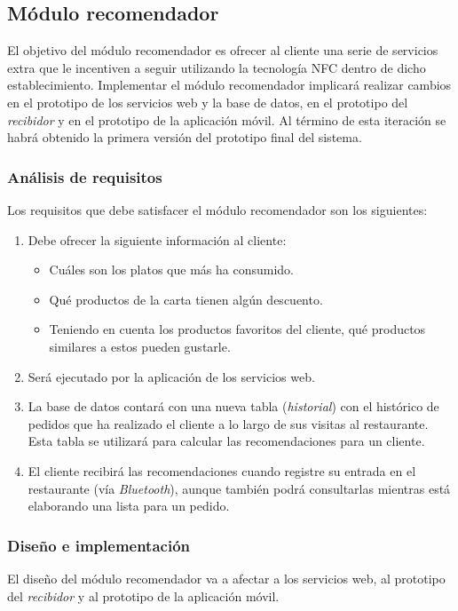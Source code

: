 \subsection{Módulo recomendador}
El objetivo del módulo recomendador es ofrecer al cliente una serie de
servicios extra que le incentiven a seguir utilizando la tecnología \acs{NFC}
dentro de dicho establecimiento. Implementar el módulo recomendador implicará
realizar cambios en el prototipo de los servicios web y la base de datos, en
el prototipo del \emph{recibidor} y en el prototipo de la aplicación móvil.
Al término de esta iteración se habrá obtenido la primera versión del prototipo
final del sistema.

\subsubsection{Análisis de requisitos}
Los requisitos que debe satisfacer el módulo recomendador son los siguientes:
\begin{enumerate}
\item Debe ofrecer la siguiente información al cliente:
  \begin{itemize}
  \item Cuáles son los platos que más ha consumido.
  \item Qué productos de la carta tienen algún descuento.
  \item Teniendo en cuenta los productos favoritos del cliente, qué productos
  similares a estos pueden gustarle.
  \end{itemize}
\item Será ejecutado por la aplicación de los servicios web.
\item La base de datos contará con una nueva tabla (\emph{historial}) con el
histórico de pedidos que ha realizado el cliente a lo largo de sus visitas
al restaurante. Esta tabla se utilizará para calcular las recomendaciones para
un cliente.
\item El cliente recibirá las recomendaciones cuando registre su entrada en el
restaurante (vía \emph{Bluetooth}), aunque también podrá consultarlas mientras
está elaborando una lista para un pedido.
\end{enumerate}

\subsubsection{Diseño e implementación}
El diseño del módulo recomendador va a afectar a los servicios web, al 
prototipo del \emph{recibidor} y al prototipo de la aplicación móvil.

